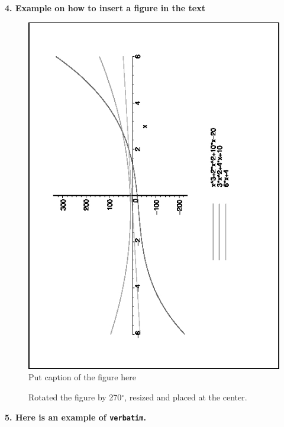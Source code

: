 \documentclass[12pt]{article}
\begin{document}
\newpage
\noindent \textbf{4. Example on how to insert a figure in the text}
\begin{figure}[htb]
\begin{center}
\includegraphics[width=2.in]{plot1.jpg} 
\caption{Put caption of the figure here}
\end{center}
\end{figure}

\begin{figure}[htb]
\begin{center}
\end{center}
\caption{Rotated the figure by 270$^\circ$, resized and placed at the center.}
\end{figure}

\newpage
\noindent \textbf{5. Here is an example of \texttt{verbatim}.} 
\end{document}

